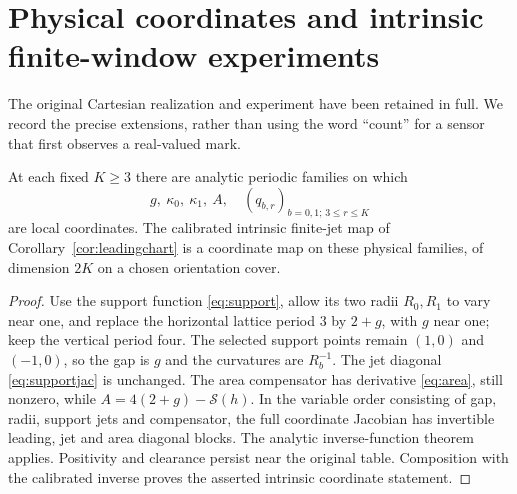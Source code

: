 \section{Physical coordinates and intrinsic finite-window experiments}
\label{sec:intrinsicexperiments}
The original Cartesian realization and experiment have been retained in
full. We record the precise extensions, rather than using the word
``count'' for a sensor that first observes a real-valued mark.

\begin{corollary}
\label{cor:physicalleading}
At each fixed $K\ge3$ there are analytic periodic families on which
\[
 g,\ \kappa_0,\ \kappa_1,\ A,
       \quad(q_{b,r})_{b=0,1;\,3\le r\le K}
\]
are local coordinates. The calibrated intrinsic finite-jet map of
Corollary~\ref{cor:leadingchart} is a coordinate map on these physical
families, of dimension $2K$ on a chosen orientation cover.
\end{corollary}
\begin{proof}
Use the support function \eqref{eq:support}, allow its two radii
$R_0,R_1$ to vary near one, and replace the horizontal lattice period
$3$ by $2+g$, with $g$ near one; keep the vertical period four.
The selected support points remain $(1,0)$ and $(-1,0)$, so the gap
is $g$ and the curvatures are $R_b^{-1}$. The jet diagonal
\eqref{eq:supportjac} is unchanged. The area compensator has derivative
\eqref{eq:area}, still nonzero, while
$A=4(2+g)-\mathcal S(h)$. In the variable order consisting of gap,
radii, support jets and compensator, the full coordinate Jacobian has
invertible leading, jet and area diagonal blocks. The analytic
inverse-function theorem applies. Positivity and clearance persist
near the original table. Composition with the calibrated inverse proves
the asserted intrinsic coordinate statement.
\end{proof}

